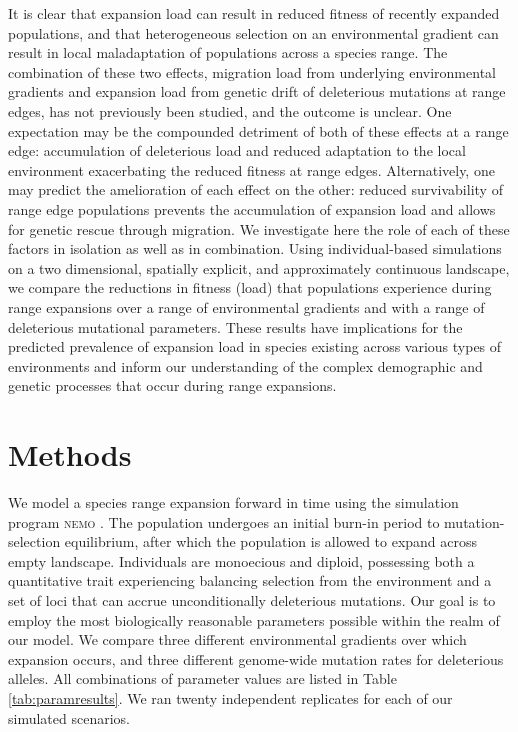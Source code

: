 It is clear that expansion load can result in reduced fitness of recently expanded populations, and that heterogeneous selection on an environmental gradient can result in local maladaptation of populations across a species range. The combination of these two effects, migration load from underlying environmental gradients and expansion load from genetic drift of deleterious mutations at range edges, has not previously been studied, and the outcome is unclear. One expectation may be the compounded detriment of both of these effects at a range edge: accumulation of deleterious load and reduced adaptation to the local environment exacerbating the reduced fitness at range edges. Alternatively, one may predict the amelioration of each effect on the other: reduced survivability of range edge populations prevents the accumulation of expansion load and allows for genetic rescue through migration. We investigate here the role of each of these factors in isolation as well as in combination. Using individual-based simulations on a two dimensional, spatially explicit, and approximately continuous landscape, we compare the reductions in fitness (load) that populations experience during range expansions over a range of environmental gradients and with a range of deleterious mutational parameters. These results have implications for the predicted prevalence of expansion load in species existing across various types of environments and inform our understanding of the complex demographic and genetic processes that occur during range expansions.




\section{Methods}


We model a species range expansion forward in time using the simulation program \textsc{nemo} \citep{Guillaume:2006}. The population undergoes an initial burn-in period to mutation-selection equilibrium, after which the population is allowed to expand across empty landscape. Individuals are monoecious and diploid, possessing both a quantitative trait experiencing balancing selection from the environment and a set of loci that can accrue unconditionally deleterious mutations. %
Our goal is to employ the most biologically reasonable parameters possible within the realm of our model. We compare three different environmental gradients over which expansion occurs, and three different genome-wide mutation rates for deleterious alleles. All combinations of parameter values are listed in Table \ref{tab:paramresults}. We ran twenty independent replicates for each of our simulated scenarios.


